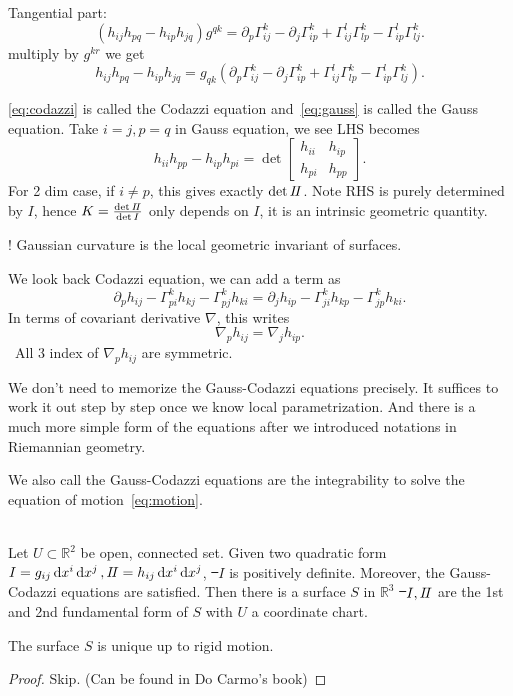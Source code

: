 Tangential part: \[
    (h_{ij}h_{pq}-h_{ip}h_{jq})g^{qk}
    =\partial_p \Gamma_{ij}^k-\partial_j\Gamma_{ip}^k
    +\Gamma_{ij}^l\Gamma_{lp}^k-\Gamma_{ip}^l\Gamma_{lj}^k
.\] multiply by \(g^{kr}\) we get
\begin{equation}\label{eq:gauss}
    h_{ij}h_{pq}-h_{ip}h_{jq}=
    g_{qk}\left(\partial_p \Gamma_{ij}^k-\partial_j\Gamma_{ip}^k
    +\Gamma_{ij}^l\Gamma_{lp}^k-\Gamma_{ip}^l\Gamma_{lj}^k\right)
.\end{equation}

\cref{eq:codazzi} is called the Codazzi equation and~\cref{eq:gauss} is called
the Gauss equation. Take \(i=j,p=q\) in Gauss equation, we see LHS becomes \[
    h_{ii}h_{pp}-h_{ip}h_{pi}=\det\begin{bmatrix}
        h_{ii} & h_{ip} \\
        h_{pi} & h_{pp}
    \end{bmatrix}
.\] For 2 dim case, if \(i\neq p\), this gives exactly \(\det I\!I\). Note RHS
is purely determined by \(I\), hence \(K=\frac{\det I\!I}{\det I}\) only depends
on \(I\), it is an intrinsic geometric quantity.

{\color{red}\large !} Gaussian curvature is the local geometric invariant of
surfaces.

We look back Codazzi equation, we can add a term as \[
    \partial_{p}h_{ij}-\Gamma_{pi}^kh_{kj}-\boxed{\Gamma_{pj}^kh_{ki}}
    =\partial_{j}h_{ip}-\Gamma_{ji}^kh_{kp}-\boxed{\Gamma_{jp}^kh_{ki}}
.\] In terms of covariant derivative \(\nabla\), this writes \[
    \nabla_p h_{ij}=\nabla_{j} h_{ip}
.\] \ie\ All 3 index of \(\nabla_p h_{ij}\) are symmetric.

\begin{remark}
    We don't need to memorize the Gauss-Codazzi equations precisely. It
    suffices to work it out step by step once we know local parametrization.
    And there is a much more simple form of the equations after we introduced
    notations in Riemannian geometry.
\end{remark}

We also call the Gauss-Codazzi equations are the integrability to solve
the equation of motion~\cref{eq:motion}.

\begin{theorem}\hfill\\
    Let \(U\subset \mathbb{R}^2\) be open, connected set. Given two quadratic
    form \(I=g_{ij}\dd{x^i}\dd{x^j}, I\!I=h_{ij}\dd{x^i}\dd{x^j}\), \st\ \(I\) is
    positively definite. Moreover, the Gauss-Codazzi equations are satisfied.
    Then there is a surface \(S\) in \(\mathbb{R}^3\) \st\ \(I,I\!I\) are the 1st
    and 2nd fundamental form of \(S\) with \(U\) a coordinate chart.

    The surface \(S\) is unique up to rigid motion.
\end{theorem}
\begin{proof}
    Skip. (Can be found in Do Carmo's book)
\end{proof}

